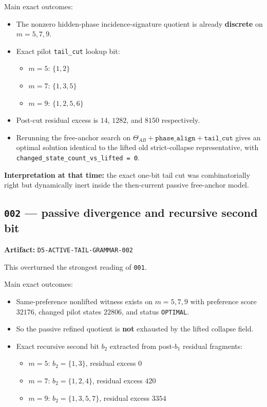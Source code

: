 \documentclass[11pt]{article}
\begin{document}
Main exact outcomes:
\begin{itemize}
    \item The nonzero hidden-phase incidence-signature quotient is already \textbf{discrete} on $m=5,7,9$.
    \item Exact pilot \texttt{tail\_cut} lookup bit:
    \begin{itemize}
        \item $m=5$: $\{1,2\}$
        \item $m=7$: $\{1,3,5\}$
        \item $m=9$: $\{1,2,5,6\}$
    \end{itemize}
    \item Post-cut residual excess is $14$, $1282$, and $8150$ respectively.
    \item Rerunning the free-anchor search on $\Theta_{AB}+\texttt{phase\_align}+\texttt{tail\_cut}$ gives an optimal solution identical to the lifted old strict-collapse representative, with \texttt{changed\_state\_count\_vs\_lifted = 0}.
\end{itemize}

\textbf{Interpretation at that time:} the exact one-bit tail cut was combinatorially right but dynamically inert inside the then-current passive free-anchor model.

\subsection*{\texttt{002} --- passive divergence and recursive second bit}

\textbf{Artifact:} \texttt{D5-ACTIVE-TAIL-GRAMMAR-002}

This overturned the strongest reading of \texttt{001}.

Main exact outcomes:
\begin{itemize}
    \item Same-preference nonlifted witness exists on $m=5,7,9$ with preference score $32176$, changed pilot states $22806$, and status \texttt{OPTIMAL}.
    \item So the passive refined quotient is \textbf{not} exhausted by the lifted collapse field.
    \item Exact recursive second bit $b_2$ extracted from post-$b_1$ residual fragments:
    \begin{itemize}
        \item $m=5$: $b_2=\{1,3\}$, residual excess $0$
        \item $m=7$: $b_2=\{1,2,4\}$, residual excess $420$
        \item $m=9$: $b_2=\{1,3,5,7\}$, residual excess $3354$
    \end{itemize}
\end{itemize}
\end{document}
